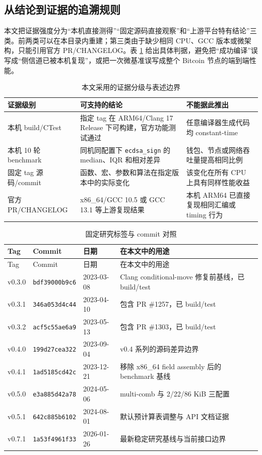 \documentclass[11pt,a4paper,fontset=none]{ctexart}
\begin{document}
\subsection{从结论到证据的追溯规则}

本文把证据强度分为“本机直接测得”“固定源码直接观察”和“上游平台特有结论”三类。前两类可以在本目录内重建；第三类由于缺少相同 CPU、GCC 版本或微架构，只能引用官方 PR/CHANGELOG。表 \ref{tab:evidence-levels} 给出具体判据，避免把“成功编译”误写成“侧信道已被本机复现”，或把一次微基准误写成整个 Bitcoin 节点的端到端性能。

\begin{table}[htbp]
\centering
\caption{本文采用的证据分级与表述边界}
\label{tab:evidence-levels}
\begin{tabular}{p{}p{}p{}}
\toprule
证据级别 & 可支持的结论 & 不能据此推出 \\
\midrule
本机 build/CTest & 指定 tag 在 ARM64/Clang 17 Release 下可构建，官方功能测试通过 & 任意编译器生成代码均 constant-time \\
本机 10 轮 benchmark & 同机同配置下 \texttt{ecdsa\_sign} 的 median、IQR 和相对差异 & 钱包、节点或网络吞吐量提高相同比例 \\
固定 tag 源码/commit & 函数、宏、参数和算法在指定版本中的实际变化 & 该变化在所有 CPU 上具有同样性能收益 \\
官方 PR/CHANGELOG & x86\_64/GCC 10.5 或 GCC 13.1 等上游复现结果 & 本机 ARM64 已直接复现相同汇编或 timing 行为 \\
\bottomrule
\end{tabular}
\end{table}

\begingroup
\setlength{\tabcolsep}{3pt}
\begin{longtable}{p{}p{}p{}p{}}
\caption{固定研究标签与 commit 对照}\label{tab:tag-commits}\\
\toprule
Tag & Commit & 日期 & 在本文中的用途 \\
\midrule
\endfirsthead
\toprule
Tag & Commit & 日期 & 在本文中的用途 \\
\midrule
\endhead
v0.3.0 & \texttt{bdf39000b9c6} & 2023-03-08 & Clang conditional-move 修复前基线，已 build/test \\
v0.3.1 & \texttt{346a053d4c44} & 2023-04-10 & 包含 PR \#1257，已 build/test \\
v0.3.2 & \texttt{acf5c55ae6a9} & 2023-05-13 & 包含 PR \#1303，已 build/test \\
v0.4.0 & \texttt{199d27cea322} & 2023-09-04 & v0.4 系列的源码差异边界 \\
v0.4.1 & \texttt{1ad5185cd42c} & 2023-12-21 & 移除 x86\_64 field assembly 后的 benchmark 基线 \\
v0.5.0 & \texttt{e3a885d42a78} & 2024-05-06 & multi-comb 与 2/22/86 KiB 三配置 \\
v0.5.1 & \texttt{642c885b6102} & 2024-08-01 & 默认预计算表调整与 API 文档证据 \\
v0.7.1 & \texttt{1a53f4961f33} & 2026-01-26 & 最新稳定研究基线与当前接口边界 \\
\bottomrule
\end{longtable}
\endgroup
\end{document}
